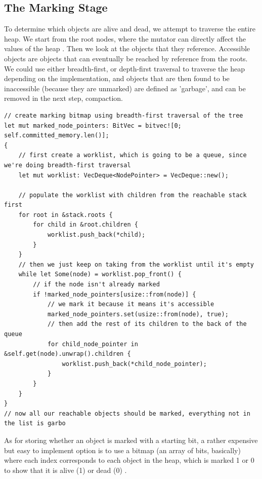 \documentclass[index]{subfiles}
\begin{document}
\subsection{The Marking Stage}

To determine which objects are alive and dead, we attempt to traverse the entire heap. We start from the root nodes, where the mutator can directly affect the values of the heap \cites[3.2~Marking]{redhat_openjdk}[Chapter~3]{gc_handbook}. Then we look at the objects that they reference. Accessible objects are objects that can eventually be reached by reference from the roots. We could use either breadth-first, or depth-first traversal to traverse the heap depending on the implementation, and  objects that are then found to be inaccessible (because they are unmarked) are defined as 'garbage', and can be removed in the next step, compaction.

\begin{verbatim}
// create marking bitmap using breadth-first traversal of the tree
let mut marked_node_pointers: BitVec = bitvec![0; self.committed_memory.len()];
{
    // first create a worklist, which is going to be a queue, since we're doing breadth-first traversal
    let mut worklist: VecDeque<NodePointer> = VecDeque::new();

    // populate the worklist with children from the reachable stack first
    for root in &stack.roots {
        for child in &root.children {
            worklist.push_back(*child);
        }
    }
    // then we just keep on taking from the worklist until it's empty
    while let Some(node) = worklist.pop_front() {
        // if the node isn't already marked
        if !marked_node_pointers[usize::from(node)] {
            // we mark it because it means it's accessible
            marked_node_pointers.set(usize::from(node), true);
            // then add the rest of its children to the back of the queue
            for child_node_pointer in &self.get(node).unwrap().children {
                worklist.push_back(*child_node_pointer);
            }
        }
    }
}
// now all our reachable objects should be marked, everything not in the list is garbo
\end{verbatim}

As for storing whether an object is marked with a starting bit, a rather expensive but easy to implement option is to use a bitmap (an array of bits, basically) where each index corresponds to each object in the heap, which is marked 1 or 0 to show that it is alive (1) or dead (0) \cite[Chapter~3]{gc_handbook}.
\end{document}
